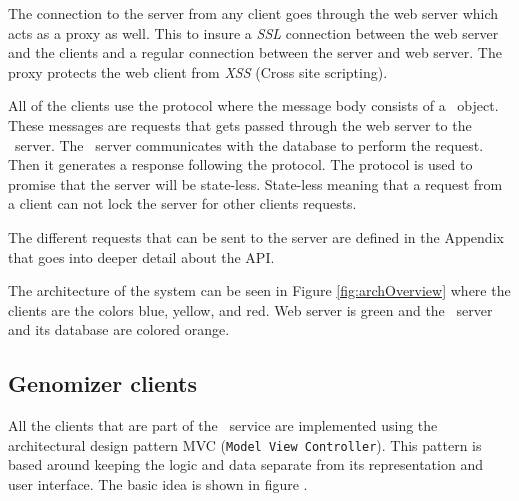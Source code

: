 The connection to the server from any client goes through the web server which acts as a proxy as well. This to insure a \textit{SSL} connection between the web server and the clients and a regular connection between the server and web server. The proxy protects the web client from \textit{XSS} (Cross site scripting). 

All of the clients use the  protocol where the message body consists of a \json\ object.
These messages are requests that gets passed through the web server to the \appName\ server. The \appName\ server communicates with the database to perform the request. Then it generates a response following the  protocol. The  protocol is used to promise that the server will be state-less. State-less meaning that a request from a client can not lock the server for other clients requests. 

The different requests that can be sent to the server are defined in the Appendix  that goes into deeper detail about the API.

The architecture of the system can be seen in Figure \ref{fig:archOverview} where the clients are the colors blue, yellow, and red. Web server is green and the \appName\ server and its database are colored orange.

\subsection{Genomizer clients}

All the clients that are part of the \appName\ service are implemented using the architectural design pattern MVC (\texttt{Model View Controller}). This pattern is based around keeping the logic and data separate from its representation and user interface. The basic idea is shown in figure .

